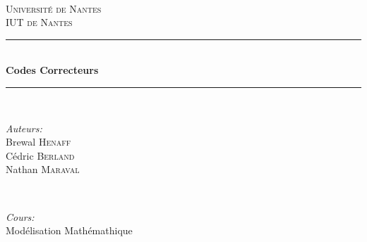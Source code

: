 \begin{titlepage}

\newcommand{\HRule}{\rule{\linewidth}{0.5mm}} %

\center %


\textsc{\LARGE }\\[1.5cm] %
\textsc{\Large Université de Nantes}\\[0.5cm] %
\textsc{\large IUT de Nantes}\\[0.5cm] %


\HRule \\[0.4cm]
{ \huge \bfseries Codes Correcteurs}\\[0.4cm] %
\HRule \\[1.5cm]


\begin{minipage}{0.4\textwidth}
\begin{flushleft} \large
\emph{Auteurs:}\\
Brewal \textsc{Henaff}\\
Cédric \textsc{Berland}\\
Nathan \textsc{Maraval}
\end{flushleft}
\end{minipage}
~
\begin{minipage}{0.4\textwidth}
\begin{flushright} \large
\emph{Cours:} \\
Modélisation Mathémathique %
\end{flushright}
\end{minipage}\\[3cm]



\end{titlepage}
